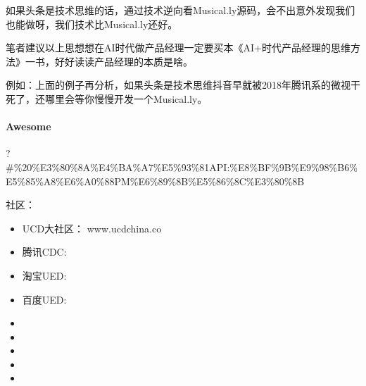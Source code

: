 \documentclass[letterpaper,11pt,english]{sphinxmanual}
\begin{document}
如果头条是技术思维的话，通过技术逆向看Musical.ly源码，会不出意外发现我们也能做呀，我们技术比Musical.ly还好。

笔者建议以上思想想在AI时代做产品经理一定要买本《AI+时代产品经理的思维方法》一书，好好读读产品经理的本质是啥。

例如：上面的例子再分析，如果头条是技术思维抖音早就被2018年腾讯系的微视干死了，还哪里会等你慢慢开发一个Musical.ly。


\paragraph{Awesome}
\label{\detokenize{chapter_introduction/PM:awesome}}
?\#\%20\%E3\%80\%8A\%E4\%BA\%A7\%E5\%93\%81API:\%E8\%BF\%9B\%E9\%98\%B6\%E5\%85\%A8\%E6\%A0\%88PM\%E6\%89\%8B\%E5\%86\%8C\%E3\%80\%8B

社区：
\begin{itemize}
\item {} 
UCD大社区： www.ucdchina.co

\item {} 
腾讯CDC: 

\item {} 
淘宝UED: 

\item {} 
百度UED: 

\item {} 

\item {} 

\item {} 

\item {} 

\item {} 

\end{itemize}
\end{document}
